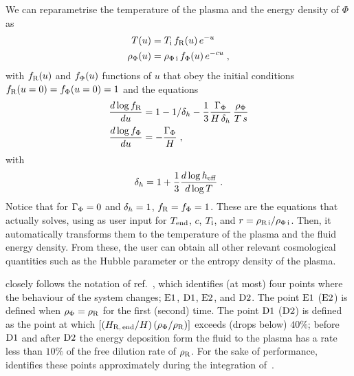 \documentclass[11pt,a4paper]{article}
\begin{document}
We can reparametrise the temperature of the plasma and the energy density of $\Phi$ as 
%
\begin{align}
	T(u) &= T_{\rm i}{}  \, f_{\rm R}(u) \, e^{-u}  \label{eq:fR_def} \\ 
	\rho_{\Phi}(u) &= \rho_{\Phi\,{\rm i}} \, f_{\Phi}(u) \label{eq:fPhi_def} \, e^{-cu}\;,
\end{align}
%
with $f_{\rm R}(u)$ and $f_{\Phi}(u)$ functions of $u$ that obey the initial conditions $f_{\rm R}(u=0)=f_{\Phi}(u=0)=1$ and the equations
%
\begin{align}
	\dfrac{d\log f_{\rm R} }{du} &=  1- 1/\delta_h{}- \dfrac{1}{3}\dfrac{\Gamma_{\Phi}}{H\,\delta_h{}} \, \dfrac{\rho_{\Phi}}{T\,s}   \label{eq:dlogfRdu} \\ 
	\dfrac{d\log f_{\Phi}}{du} &= -\dfrac{\Gamma_{\Phi}}{H} \label{eq:dlogfPhidu} \;,
\end{align}
%
with 
\begin{equation}
	\delta_h{} = 1+ \dfrac{1}{3} \dfrac{d\log h_{\rm eff}{}}{d\log T}\;.
	\label{eq:dh_def}
\end{equation}
%
Notice that for $\Gamma_{\Phi}=0$ and $\delta_h{}=1$, $f_{\rm R}=f_{\Phi}=1$. These are the equations that \nsc actually solves, using as user input for $T_{\rm end}{}$, $c$, $T_{\rm i}{}$, and $r=\rho_{\rm R\,i}/\rho_{\Phi\,{\rm i}}$. Then, it automatically transforms them to the temperature of the plasma and the fluid energy density. From these, the user can obtain all other relevant cosmological quantities such as the Hubble parameter or the entropy density of the plasma.

\nsc closely follows the notation of ref.~\cite{Arias:2020qty}, which identifies (at most) four points where the behaviour of the system changes; ${\rm E1}{}$, ${\rm D1}{}$, ${\rm E2}{}$, and ${\rm D2}{}$. The point ${\rm E1}{}$ (${\rm E2}{}$) is defined when $\rho_{\Phi}=\rho_{\rm R}$ for the first (second) time. The point ${\rm D1}{}$ (${\rm D2}{}$) is defined as the point at which $\left[  (H_{\rm R,\,end}/H) \, (\rho_{\Phi}/\rho_{\rm R})  \right]$ exceeds (drops below) $40\%$; \ie before ${\rm D1}{}$ and after ${\rm D2}{}$ the energy deposition form the fluid to the plasma has a rate less than $10\%$ of the free dilution rate of $\rho_{\rm R}$.
%
For the sake of performance, \nsc identifies these points approximately during the integration of~.  
\end{document}
